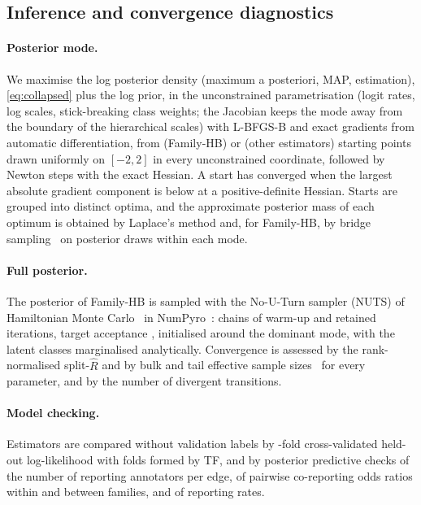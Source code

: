 \subsection{Inference and convergence diagnostics}\label{sec:inference}
\paragraph{Posterior mode.} We maximise the log posterior density (maximum a posteriori, MAP, estimation), \eqref{eq:collapsed} plus the log prior, in the unconstrained parametrisation (logit rates, log scales, stick-breaking class weights; the Jacobian keeps the mode away from the boundary of the hierarchical scales) with L-BFGS-B and exact gradients from automatic differentiation, from \nMapRestartsHb{} (Family-HB) or \nMapRestartsOther{} (other estimators) starting points drawn uniformly on $[-2,2]$ in every unconstrained coordinate, followed by Newton steps with the exact Hessian. A start has converged when the largest absolute gradient component is below \nGradTol{} at a positive-definite Hessian. Starts are grouped into distinct optima, and the approximate posterior mass of each optimum is obtained by Laplace's method and, for Family-HB, by bridge sampling~\citep{meng1996simulating,gronau2017tutorial} on posterior draws within each mode.

\paragraph{Full posterior.} The posterior of Family-HB is sampled with the No-U-Turn sampler (NUTS) of Hamiltonian Monte Carlo~\citep{hoffman2014nuts} in NumPyro~\citep{phan2019numpyro}: \nNutsChains{} chains of \nNutsWarmup{} warm-up and \nNutsDraws{} retained iterations, target acceptance \nNutsTargetAccept{}, initialised around the dominant mode, with the latent classes marginalised analytically. Convergence is assessed by the rank-normalised split-$\widehat{R}$ and by bulk and tail effective sample sizes~\citep{vehtari2021rank} for every parameter, and by the number of divergent transitions.

\paragraph{Model checking.} Estimators are compared without validation labels by \nCvFolds{}-fold cross-validated held-out log-likelihood with folds formed by TF, and by posterior predictive checks of the number of reporting annotators per edge, of pairwise co-reporting odds ratios within and between families, and of reporting rates.

